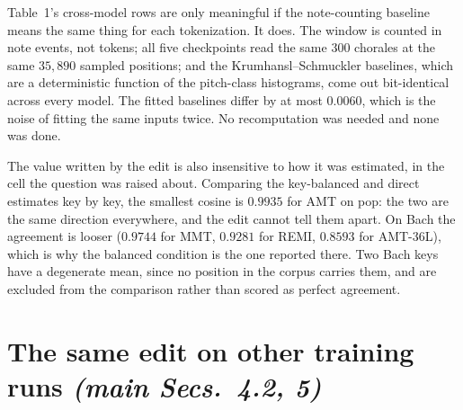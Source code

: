 \documentclass{article}
\begin{document}
Table~1's cross-model rows are only meaningful if the note-counting baseline means the
same thing for each tokenization. It does. The window is counted in note events, not
tokens; all five checkpoints read the same $300$ chorales at the same $35{,}890$ sampled
positions; and the Krumhansl--Schmuckler baselines, which are a deterministic function of
the pitch-class histograms, come out bit-identical across every model. The fitted
baselines differ by at most $0.0060$, which is the noise of fitting the same inputs
twice. No recomputation was needed and none was done.

The value written by the edit is also insensitive to how it was estimated, in the cell
the question was raised about. Comparing the key-balanced and direct estimates key by
key, the smallest cosine is $0.9935$ for AMT on pop: the two are the same direction
everywhere, and the edit cannot tell them apart. On Bach the agreement is looser
($0.9744$ for MMT, $0.9281$ for REMI, $0.8593$ for AMT-36L), which is why the balanced
condition is the one reported there. Two Bach keys have a degenerate mean, since no
position in the corpus carries them, and are excluded from the comparison rather than
scored as perfect agreement.

\section{The same edit on other training runs \normalfont\textit{(main Secs.~4.2, 5)}}
\label{sec:seeds}
%
\end{document}

